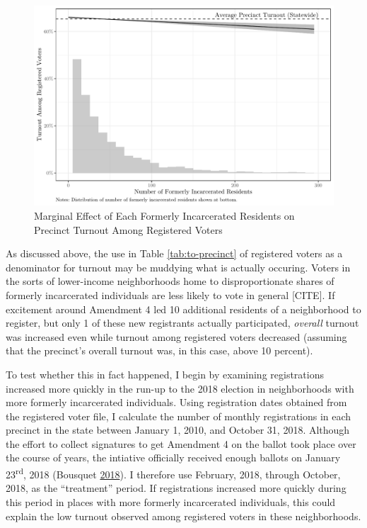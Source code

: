 \documentclass[
  12pt,
]{article}
\begin{document}
\begin{figure}[H]

{\centering \includegraphics{write_files/figure-latex/marg1-1} 

}

\caption{\label{fig:marg1}Marginal Effect of Each Formerly Incarcerated Residents on Precinct Turnout Among Registered Voters}\label{fig:marg1}
\end{figure}

As discussed above, the use in Table \ref{tab:to-precinct} of registered voters as a denominator for turnout may be muddying what is actually occuring. Voters in the sorts of lower-income neighborhoods home to disproportionate shares of formerly incarcerated individuals are less likely to vote in general {[}CITE{]}. If excitement around Amendment 4 led 10 additional residents of a neighborhood to register, but only 1 of these new registrants actually participated, \emph{overall} turnout was increased even while turnout among registered voters decreased (assuming that the precinct's overall turnout was, in this case, above 10 percent).

To test whether this in fact happened, I begin by examining registrations increased more quickly in the run-up to the 2018 election in neighborhoods with more formerly incarcerated individuals. Using registration dates obtained from the registered voter file, I calculate the number of monthly registrations in each precinct in the state between January 1, 2010, and October 31, 2018. Although the effort to collect signatures to get Amendment 4 on the ballot took place over the course of years, the intiative officially received enough ballots on January 23\textsuperscript{rd}, 2018 (Bousquet \protect\hyperlink{ref-Bousquet2018}{2018}). I therefore use February, 2018, through October, 2018, as the ``treatment'' period. If registrations increased more quickly during this period in places with more formerly incarcerated individuals, this could explain the low turnout observed among registered voters in these neighborhoods.
\end{document}
